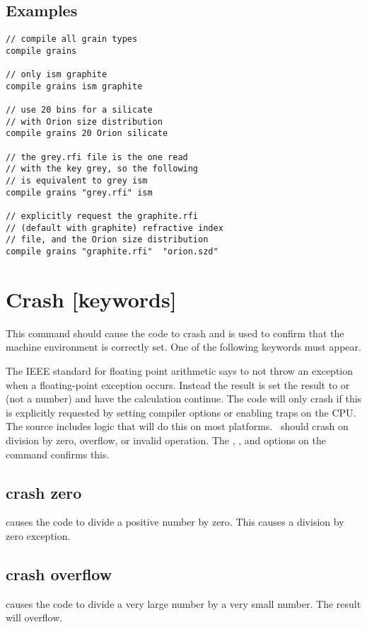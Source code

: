 \subsection{Examples}
\begin{verbatim}
// compile all grain types
compile grains

// only ism graphite
compile grains ism graphite

// use 20 bins for a silicate
// with Orion size distribution
compile grains 20 Orion silicate

// the grey.rfi file is the one read
// with the key grey, so the following
// is equivalent to grey ism
compile grains "grey.rfi" ism

// explicitly request the graphite.rfi
// (default with graphite) refractive index
// file, and the Orion size distribution
compile grains "graphite.rfi"  "orion.szd"
\end{verbatim}

\section{Crash [keywords]}

This command should cause the code to crash and is used to confirm that
the machine environment is correctly set.
One of the following keywords must appear.

The IEEE standard for floating point arithmetic says to not throw an
exception when a floating-point exception occurs.
Instead the result is
set the result to  or  (not a number)
and have the calculation continue.
The code will only crash if this is explicitly requested by
setting compiler options or enabling traps on the CPU.
The source includes
logic that will do this on most platforms.
\Cloudy\ should crash on division
by zero, overflow, or invalid operation.
The ,
, and  options
on the  command confirms this.

\subsection{crash zero} causes the code to divide a positive number by zero.  This
causes a division by zero exception.

\subsection{crash overflow} causes the code to divide a very large number by a very
small number.  The result will overflow.

